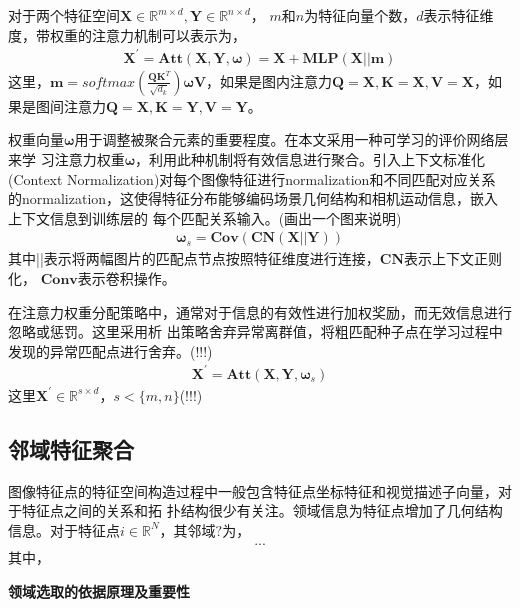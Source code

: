 \documentclass[10pt]{article}
\begin{document}
对于两个特征空间$\mathbf{X}\in \mathbb{R}^{m \times d},\mathbf{Y}\in \mathbb{R}^{n \times d}$，
$m$和$n$为特征向量个数，$d$表示特征维度，带权重的注意力机制可以表示为，
\begin{align} 
    \mathbf{X}^{'} = \mathbf{Att}(\mathbf{X},\mathbf{Y},\mathbf{\omega})=
    \mathbf{X}+\mathbf{MLP}(\mathbf{X}||\mathbf{m})
\end{align}
这里，$\mathbf{m}=softmax(\frac{\mathbf{Q}\mathbf{K}^T}{\sqrt{d_k}})\mathbf{\omega}
\mathbf{V}$\cite{Vaswani2017}，如果是图内注意力$\mathbf{Q}=\mathbf{X},\mathbf{K}=\mathbf{X},
\mathbf{V}=\mathbf{X}$，如果是图间注意力$\mathbf{Q}=\mathbf{X},\mathbf{K}=\mathbf{Y},
\mathbf{V}=\mathbf{Y}$。

权重向量$\mathbf{\omega}$用于调整被聚合元素的重要程度。在本文采用一种可学习的评价网络层来学
习注意力权重$\mathbf{\omega}$，利用此种机制将有效信息进行聚合。引入上下文标准化
(Context Normalization)\cite{Yi2017}对每个图像特征进行normalization和不同匹配对应关系
的normalization，这使得特征分布能够编码场景几何结构和相机运动信息，嵌入上下文信息到训练层的
每个匹配关系输入。(画出一个图来说明)
\begin{align} 
    \mathbf{\omega}_{s}=\mathbf{Cov}(\mathbf{CN}(\mathbf{X}||\mathbf{Y}))
\end{align}
其中||表示将两幅图片的匹配点节点按照特征维度进行连接，$\mathbf{CN}$表示上下文正则化，
$\mathbf{Conv}$表示卷积操作。 

在注意力权重分配策略中，通常对于信息的有效性进行加权奖励，而无效信息进行忽略或惩罚。这里采用析
出策略舍弃异常离群值，将粗匹配种子点在学习过程中发现的异常匹配点进行舍弃。(!!!)
\begin{align}
    \mathbf{X}^{'}=\mathbf{Att}(\mathbf{X}, \mathbf{Y}, \mathbf{\omega}_{s})
\end{align}
这里$\mathbf{X}^{'}\in \mathbb{R}^{s \times d}$，$s<\{m,n\}$(!!!)
\subsection{邻域特征聚合}
图像特征点的特征空间构造过程中一般包含特征点坐标特征和视觉描述子向量，对于特征点之间的关系和拓
扑结构很少有关注。领域信息为特征点增加了几何结构信息。对于特征点$i \in \mathbb{R}^{N}$，其邻域$?$为，
\begin{align}
    ... 
\end{align}
其中，

\textbf{领域选取的依据原理及重要性}


    
\end{document}
